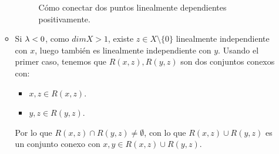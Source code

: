 \begin{ejercicio}
\begin{itemize}
\begin{itemize}
\begin{figure}[H]
\begin{tikzpicture}[scale=2]
            \end{tikzpicture}
            \caption{Cómo conectar dos puntos linealmente dependientes positivamente.}
        \end{figure}
    \item Si $\lm < 0$, como $dim X > 1$, existe $z\in X\setminus \{0\}$ linealmente independiente con $x$, luego también es linealmente independiente con $y$. Usando el primer caso, tenemos que $R(x,z), R(y,z)$ son dos conjuntos conexos con:
        \begin{itemize}
            \item $x,z\in R(x,z)$.
            \item $y,z\in R(y,z)$.
        \end{itemize}
        Por lo que $R(x,z)\cap R(y,z)\neq \emptyset $, con lo que $R(x,z)\cup R(y,z)$ es un conjunto conexo con $x,y\in R(x,z)\cup R(y,z)$.
        \begin{figure}[H]
            \centering
\end{figure}
\end{itemize}
\end{itemize}
\end{ejercicio}
